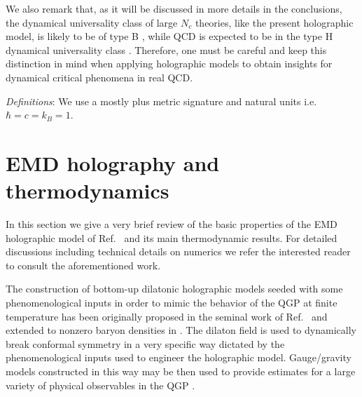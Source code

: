 \documentclass[aps,prd,showkeys,superscriptaddress,singlecolumn,nofootinbib,floatfix]{revtex4-1}
\begin{document}
We also remark that, as it will be discussed in more details in the conclusions, the dynamical universality class \cite{Hohenberg:1977ym} of large $N_c$ theories, like the present holographic model, is likely to be of type B \cite{Natsuume:2010bs}, while QCD is expected to be in the type H dynamical universality class \cite{Son:2004iv}. Therefore, one must be careful and keep this distinction in mind when applying holographic models to obtain insights for dynamical critical phenomena in real QCD.

\emph{Definitions}: We use a mostly plus metric signature and natural units i.e. $\hbar = c = k_B = 1$.



\section{EMD holography and thermodynamics}
\label{sec:EMD}

In this section we give a very brief review of the basic properties of the EMD holographic model of Ref.\ \cite{Critelli:2017oub} and its main thermodynamic results. For detailed discussions including technical details on numerics we refer the interested reader to consult the aforementioned work.

The construction of bottom-up dilatonic holographic models seeded with some phenomenological inputs in order to mimic the behavior of the QGP at finite temperature has been originally proposed in the seminal work of Ref.\ \cite{Gubser:2008ny} and extended to nonzero baryon densities in \cite{DeWolfe:2010he,DeWolfe:2011ts}. The dilaton field is used to dynamically break conformal symmetry in a very specific way dictated by the phenomenological inputs used to engineer the holographic model. Gauge/gravity \cite{Maldacena:1997re,Gubser:1998bc,Witten:1998qj,Witten:1998zw} models constructed in this way may be then used to provide estimates for a large variety of physical observables in the QGP \cite{Gubser:2008yx,DeWolfe:2010he,DeWolfe:2011ts,Finazzo:2013efa,Finazzo:2014cna,Rougemont:2015wca,Rougemont:2015ona,Finazzo:2015xwa,Rougemont:2017tlu,Critelli:2017oub,Rougemont:2015oea,Finazzo:2016mhm,Critelli:2016cvq}.
\end{document}
